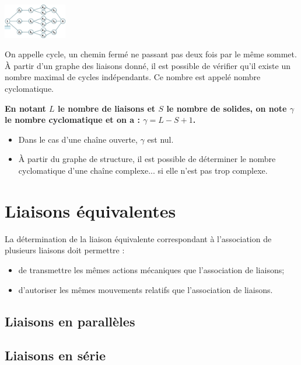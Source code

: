 \documentclass[10pt,fleqn]{article} %
\begin{document}
\begin{defi}
\begin{multicols}{3}
\begin{center}
\vspace{.5cm}

\includegraphics[height=1.5cm]{images/haptique_02}
\end{center}

\end{multicols}

On appelle cycle, un chemin fermé ne passant pas deux fois par le même sommet.
À partir d’un graphe des liaisons donné, il est possible de vérifier qu’il existe un nombre
maximal de cycles indépendants. Ce nombre est appelé nombre cyclomatique. 

\textbf{En notant $L$ le nombre de liaisons et $S$ le nombre de solides, on note $\gamma$ le nombre cyclomatique et on a : $\gamma = L - S + 1$.}
\end{defi}

\begin{rem}
\begin{itemize}
\item Dans le cas d'une chaîne ouverte, $\gamma$ est nul. 
\item À partir du graphe de structure, il est possible de déterminer le nombre cyclomatique d'une chaîne complexe... si elle n'est pas trop complexe.
\end{itemize}
\end{rem}

\section{Liaisons équivalentes}
\begin{obj}
La détermination de la liaison équivalente correspondant à l'association de plusieurs liaisons doit permettre : 
\begin{itemize}
\item de transmettre les mêmes actions mécaniques que l'association de liaisons;
\item d'autoriser les mêmes mouvements relatifs que l'association de liaisons.
\end{itemize}
\end{obj}
\subsection{Liaisons en parallèles}
\subsection{Liaisons en série}
\end{document}
